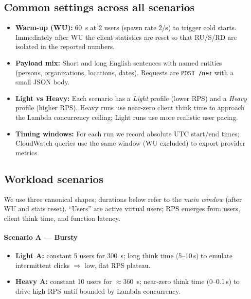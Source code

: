 \documentclass[11pt,a4paper]{article}
\begin{document}
\subsection{Common settings across all scenarios}
\begin{itemize}
  \item \textbf{Warm-up (WU):} \SI{60}{s} at 2 users (spawn rate 2/s) to trigger cold starts. Immediately after WU the client statistics are reset so that RU/S/RD are isolated in the reported numbers.
  \item \textbf{Payload mix:} Short and long English sentences with named entities (persons, organizations, locations, dates). Requests are \texttt{POST /ner} with a small JSON body.
  \item \textbf{Light vs Heavy:} Each scenario has a \emph{Light} profile (lower RPS) and a \emph{Heavy} profile (higher RPS). Heavy runs use near-zero client think time to approach the Lambda concurrency ceiling; Light runs use more realistic user pacing.
  \item \textbf{Timing windows:} For each run we record absolute UTC start/end times; CloudWatch queries use the same window (WU excluded) to export provider metrics.
\end{itemize}

\subsection{Workload scenarios}
We use three canonical shapes; durations below refer to the \emph{main window} (after WU and stats reset). ``Users'' are active virtual users; RPS emerges from users, client think time, and function latency.

\paragraph{Scenario A — Bursty}
\begin{itemize}
  \item \textbf{Light A:} constant 5 users for \SI{300}{s}; long think time (5–10\,s) to emulate intermittent clicks $\Rightarrow$ low, flat RPS plateau.
  \item \textbf{Heavy A:} constant 10 users for $\approx$\SI{360}{s}; near-zero think time (0–0.1\,s) to drive high RPS until bounded by Lambda concurrency.
\end{itemize}
\end{document}
